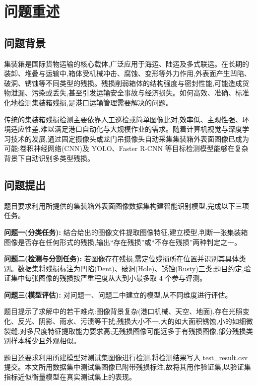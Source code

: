 \section{问题重述}

\subsection{问题背景}

集装箱是国际货物运输的核心载体,广泛应用于海运、陆运及多式联运。在长期的装卸、堆叠与运输中,箱体受机械冲击、腐蚀、变形等外力作用,外表面产生凹陷、破洞、锈蚀等不同类型的残损。残损削弱箱体的结构强度与密封性能,可能造成货物泄漏、污染或丢失,甚至引发运输安全事故与经济损失。如何高效、准确、标准化地检测集装箱残损,是港口运输管理需要解决的问题。

传统的集装箱残损检测主要依靠人工巡检或简单图像比对,效率低、主观性强、环境适应性差,难以满足港口自动化与大规模作业的需求。随着计算机视觉与深度学习技术的发展,通过固定摄像头或龙门吊摄像头自动采集集装箱外表面图像已成为可能;卷积神经网络(CNN)及 YOLO、Faster R-CNN 等目标检测模型能够在复杂背景下自动识别多类型残损。

\subsection{问题提出}

题目要求利用所提供的集装箱外表面图像数据集构建智能识别模型,完成以下三项任务。

\textbf{问题一(分类任务):} 结合给出的图像文件提取图像特征,建立模型,判断一张集装箱图像是否存在任何形式的残损,输出“存在残损”或“不存在残损”两种判定之一。

\textbf{问题二(检测与分割任务):} 若图像存在残损,需定位残损所在位置并识别其具体类别。数据集将残损标注为凹陷(Dent)、破洞(Hole)、锈蚀(Rusty)三类;题目约定,验证集中每张图像的残损按严重程度从大到小最多取 4 个参与评测。

\textbf{问题三(模型评估):} 对问题一、问题二中建立的模型,从不同维度进行评估。

题目提示了求解中的若干难点:图像背景复杂(港口机械、天空、地面),存在光照变化、反光、阴影、雨水、污渍等干扰;残损大小不一,大的如大面积锈蚀,小的如细微裂缝,对多尺度特征提取能力要求高;无残损图像可能远多于有残损图像,部分残损类别样本稀少且外观相似。

题目还要求利用所建模型对测试集图像进行检测,将检测结果写入 test\_result.csv 提交。本文所用数据集中测试集图像已附带残损标注,故将其用作验证集,以验证集指标近似衡量模型在真实测试集上的表现。
